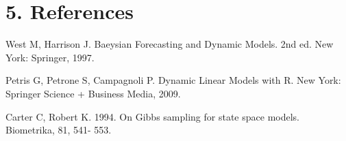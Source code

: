 \documentclass{article}
\begin{document}
\section{5. References}

\begin{enumerate}[label={[\arabic*]}]
	\item West M, Harrison J. Baeysian Forecasting and Dynamic Models. 2nd ed. New York: Springer, 1997.
	\item Petris G, Petrone S, Campagnoli P. Dynamic Linear Models with R. New York: Springer Science + Business Media, 2009.
	\item Carter C, Robert K. 1994. On Gibbs sampling for state space models. Biometrika, 81, 541- 553.
\end{enumerate}



\end{document}
